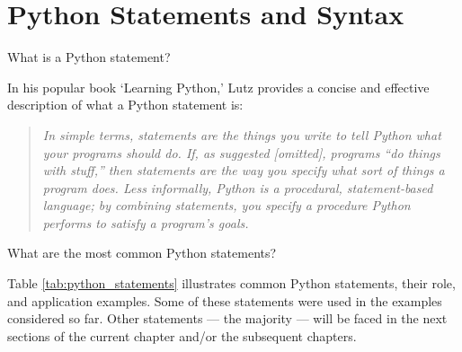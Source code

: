 \documentclass[a4paper,11pt]{book}
\newcommand{\question}[1]{%
    \begin{tcolorbox}[colback=comp_c!10,colframe=comp_c,sidebyside align=top,width=\linewidth,before skip=1ex]
        #1
    \end{tcolorbox}
    \switchcolumn%
}
\newcommand{\note}[1]{%
    \begin{tcolorbox}[colback=white!0,colframe=white!10,width=\linewidth,before skip=1ex]
        #1
    \end{tcolorbox}
}
\begin{document}
\section{Python Statements and Syntax}
\label{sec:statements_syntax}

\begin{paracol}{2}
	\question{\raggedright What is a Python statement?}
	\note{In his popular book `Learning Python,' Lutz provides a concise and effective description of what a Python statement is:
		\begin{quote}
			\textit{In simple terms, statements are the things you write to tell Python what your programs should do. If, as suggested [omitted], programs ``do things with stuff,'' then statements are the way you specify what sort of things a program does. Less informally, Python is a procedural, statement-based language; by combining statements, you specify a procedure Python performs to satisfy a program's goals.} 
		\end{quote}
	}
\end{paracol}

\begin{paracol}{2}
	\question{\raggedright What are the most common Python statements?}
	\note{Table \ref{tab:python_statements} illustrates common Python statements, their role, and application examples. Some of these statements were used in the examples considered so far. Other statements --- the majority --- will be faced in the next sections of the current chapter and/or the subsequent chapters.}
\end{paracol}
\clearpage
\end{document}
